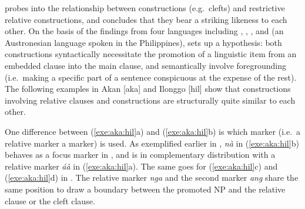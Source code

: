\citet{schachter:73} probes into the relationship between 
constructions (e.g.\ clefts) and restrictive relative
constructions, and concludes that they bear a striking likeness to
each other. On the basis of the findings from four languages including
, , , and  (an
Austronesian language spoken in the Philippines),
\citeauthor{schachter:73} sets up a hypothesis: both constructions
syntactically necessitate the promotion of a linguistic item from an
embedded clause into the main clause, and semantically involve
foregrounding (i.e.\ making a specific part of a sentence conspicuous
at the expense of the rest). The following examples in Akan [aka] and
Ilonggo [hil] show that constructions involving relative clauses and
 constructions are structurally quite similar to each other.





\noindent One difference between (\ref{exe:aka:hil}a) and
(\ref{exe:aka:hil}b) is which marker (i.e.\ a relative marker \vs a
 marker) is used. As exemplified earlier in
, \textit{n\`{a}} in (\ref{exe:aka:hil}b) behaves
as a focus marker in , and is in complementary distribution
with a relative marker \textit{\'{a}\`{a}} in
(\ref{exe:aka:hil}a). The same goes for (\ref{exe:aka:hil}c) and
(\ref{exe:aka:hil}d) in . The
relative marker \textit{nga} and the second  marker \textit{ang}
share the same position to draw a boundary between the promoted NP and
the relative clause or the cleft clause.




